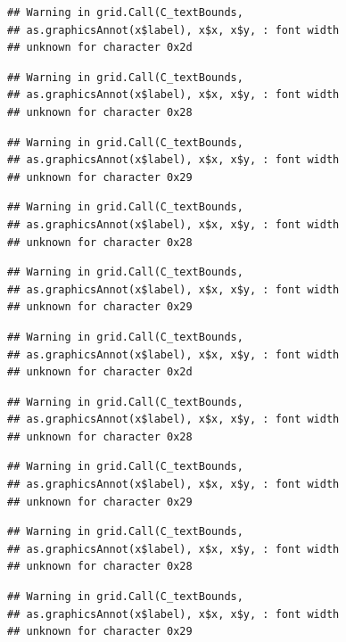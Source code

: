 \documentclass[
]{book}
\begin{document}
\begin{verbatim}
## Warning in grid.Call(C_textBounds,
## as.graphicsAnnot(x$label), x$x, x$y, : font width
## unknown for character 0x2d
\end{verbatim}

\begin{verbatim}
## Warning in grid.Call(C_textBounds,
## as.graphicsAnnot(x$label), x$x, x$y, : font width
## unknown for character 0x28
\end{verbatim}

\begin{verbatim}
## Warning in grid.Call(C_textBounds,
## as.graphicsAnnot(x$label), x$x, x$y, : font width
## unknown for character 0x29
\end{verbatim}

\begin{verbatim}
## Warning in grid.Call(C_textBounds,
## as.graphicsAnnot(x$label), x$x, x$y, : font width
## unknown for character 0x28
\end{verbatim}

\begin{verbatim}
## Warning in grid.Call(C_textBounds,
## as.graphicsAnnot(x$label), x$x, x$y, : font width
## unknown for character 0x29
\end{verbatim}

\begin{verbatim}
## Warning in grid.Call(C_textBounds,
## as.graphicsAnnot(x$label), x$x, x$y, : font width
## unknown for character 0x2d
\end{verbatim}

\begin{verbatim}
## Warning in grid.Call(C_textBounds,
## as.graphicsAnnot(x$label), x$x, x$y, : font width
## unknown for character 0x28
\end{verbatim}

\begin{verbatim}
## Warning in grid.Call(C_textBounds,
## as.graphicsAnnot(x$label), x$x, x$y, : font width
## unknown for character 0x29
\end{verbatim}

\begin{verbatim}
## Warning in grid.Call(C_textBounds,
## as.graphicsAnnot(x$label), x$x, x$y, : font width
## unknown for character 0x28
\end{verbatim}

\begin{verbatim}
## Warning in grid.Call(C_textBounds,
## as.graphicsAnnot(x$label), x$x, x$y, : font width
## unknown for character 0x29
\end{verbatim}
\end{document}
